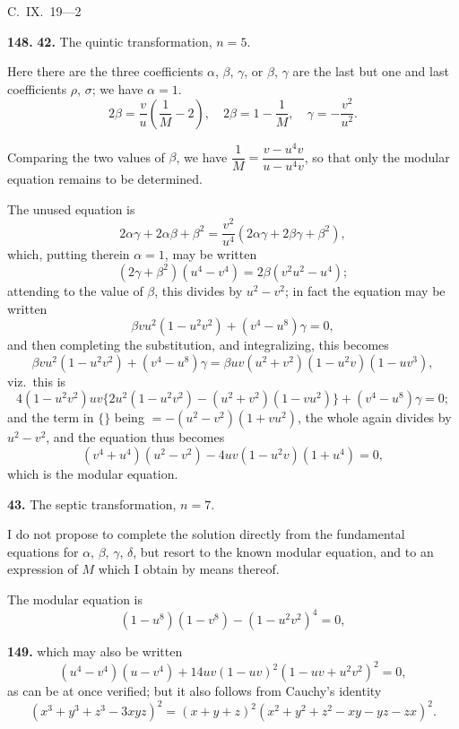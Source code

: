 \documentclass[11pt,a4paper]{book}
\begin{document}
\begin{flushright}
C.~IX.~19---2
\end{flushright}


\noindent\textbf{148.} \textbf{42.} The quintic transformation, $n = 5$.

Here there are the three coefficients $\alpha$, $\beta$, $\gamma$, or $\beta$, $\gamma$ are the last but one and last coefficients $\rho$, $\sigma$; we have $\alpha = 1$.
\[
2\beta = \frac{v}{u}\left(\frac{1}{M} - 2\right), \quad 2\beta = 1 - \frac{1}{M}, \quad \gamma = -\frac{v^2}{u^2}.
\]

Comparing the two values of $\beta$, we have $\dfrac{1}{M} = \dfrac{v - u^4v}{u - u^4v}$, so that only the modular equation remains to be determined.

The unused equation is
\[
2\alpha\gamma + 2\alpha\beta + \beta^2 = \frac{v^2}{u^4}(2\alpha\gamma + 2\beta\gamma + \beta^2),
\]
which, putting therein $\alpha = 1$, may be written
\[
(2\gamma + \beta^2)(u^4 - v^4) = 2\beta(v^2u^2 - u^4);
\]
attending to the value of $\beta$, this divides by $u^2 - v^2$; in fact the equation may be written
\[
\beta v u^2(1 - u^2v^2) + (v^4 - u^8)\gamma = 0,
\]
and then completing the substitution, and integralizing, this becomes
\[
\beta vu^2(1 - u^2v^2) + (v^4 - u^8)\gamma = \beta uv(u^2 + v^2)(1 - u^2v)(1 - uv^3),
\]
viz.\ this is
\[
4(1 - u^2v^2)uv\{2u^2(1 - u^2v^2) - (u^2 + v^2)(1 - vu^2)\} + (v^4 - u^8)\gamma = 0;
\]
and the term in $\{\}$ being $= -(u^2 - v^2)(1 + vu^2)$, the whole again divides by $u^2 - v^2$, and the equation thus becomes
\[
(v^4 + u^4)(u^2 - v^2) - 4uv(1 - u^2v)(1 + u^4) = 0,
\]
which is the modular equation.

\medskip
\noindent\textbf{43.} The septic transformation, $n = 7$.

I do not propose to complete the solution directly from the fundamental equations for $\alpha$, $\beta$, $\gamma$, $\delta$, but resort to the known modular equation, and to an expression of $M$ which I obtain by means thereof.

The modular equation is
\[
(1 - u^8)(1 - v^8) - (1 - u^2v^2)^4 = 0,
\]


\noindent\textbf{149.} which may also be written
\[
(u^4 - v^4)(u - v^4) + 14uv(1 - uv)^2(1 - uv + u^2v^2)^2 = 0,
\]
as can be at once verified; but it also follows from Cauchy's identity
\[
(x^3 + y^3 + z^3 - 3xyz)^2 = (x + y + z)^2(x^2 + y^2 + z^2 - xy - yz - zx)^2.
\]
\end{document}
